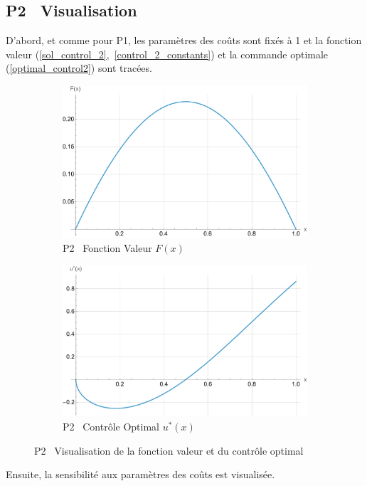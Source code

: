 \subsection{P2 \textemdash~Visualisation}
D'abord, et comme pour P1, les paramètres des coûts sont fixés à 1 et la fonction valeur (\ref{sol_control_2},~\ref{control_2_constants}) et la commande optimale (\ref{optimal_control2}) sont tracées.
\begin{figure}[htb]
    \centering
    \begin{subfigure}{0.45\linewidth}
        \includegraphics[width=\linewidth]{img/validation/P2/p2_value.pdf}
        \caption{P2 \textemdash~Fonction Valeur $F(x)$}\label{fig:ValueVisualisation2}
    \end{subfigure}
    \hfill
    \begin{subfigure}{0.45\linewidth}
        \includegraphics[width=\linewidth]{img/validation/P2/p2_control.pdf}
        \caption{P2 \textemdash~Contrôle Optimal $u^*(x)$}\label{fig:ControlVisualisation2}
    \end{subfigure}
    \caption{P2 \textemdash~Visualisation de la fonction valeur et du contrôle optimal}\label{fig:ValueControlComparison2}
\end{figure}\FloatBarrier Ensuite, la sensibilité aux paramètres des coûts est visualisée.
